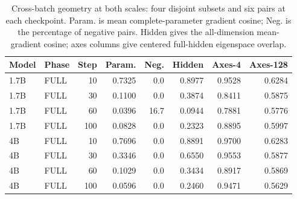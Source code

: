 \begin{table}[!htbp]
\centering
\caption{Cross-batch geometry at both scales: four disjoint subsets and six pairs at each checkpoint. Param. is mean complete-parameter gradient cosine; Neg. is the percentage of negative pairs. Hidden gives the all-dimension mean-gradient cosine; axes columns give centered full-hidden eigenspace overlap.}
\label{tab:two_scale_batch}
\small
\setlength{\tabcolsep}{3pt}
\begin{tabular}{llrrrrrr}
\toprule
Model & Phase & Step & Param. & Neg. & Hidden & Axes-4 & Axes-128 \\
\midrule
1.7B & FULL & 10 & 0.7325 & 0.0 & 0.8977 & 0.9528 & 0.6284 \\
1.7B & FULL & 30 & 0.1100 & 0.0 & 0.3874 & 0.8411 & 0.5875 \\
1.7B & FULL & 60 & 0.0396 & 16.7 & 0.0944 & 0.7881 & 0.5776 \\
1.7B & FULL & 100 & 0.0828 & 0.0 & 0.2323 & 0.8895 & 0.5997 \\
4B & FULL & 10 & 0.7696 & 0.0 & 0.8891 & 0.9700 & 0.6283 \\
4B & FULL & 30 & 0.3346 & 0.0 & 0.6550 & 0.9553 & 0.5877 \\
4B & FULL & 60 & 0.1029 & 0.0 & 0.3434 & 0.8917 & 0.5869 \\
4B & FULL & 100 & 0.0596 & 0.0 & 0.2460 & 0.9471 & 0.5629 \\
\bottomrule
\end{tabular}
\end{table}
